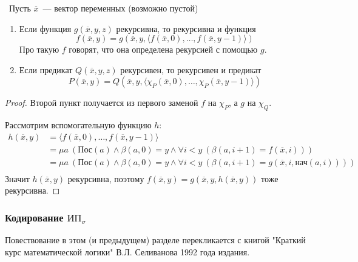\begin{theorem}\
    Пусть $\overline{x}$~— вектор переменных (возможно пустой)
    \begin{enumerate}
        \item Если функция $g(\overline{x}, y, z)$ рекурсивна, то рекурсивна и функция $$f(\overline{x}, y)=g(\overline{x}, y, \langle f(\overline{x}, 0), \ldots, f(\overline{x}, y-1)\rangle)$$ Про такую $f$ говорят, что она определена рекурсией с помощью $g$.
        \item Если предикат $Q(\overline{x}, y, z)$ рекурсивен, то рекурсивен и предикат $$P(\overline{x}, y)=Q(\overline{x}, y, \langle \chi_P(\overline{x}, 0), \ldots, \chi_P(\overline{x}, y-1)\rangle)$$
    \end{enumerate}

\end{theorem}

\begin{proof}
Второй пункт получается из первого заменой $f$ на $\chi_P$, а $g$ на $\chi_Q$.

Рассмотрим вспомогательную функцию $h$:
\[
    \begin{aligned}
        h(\overline{x}, y) &= \langle f(\overline{x}, 0), \ldots, f(\overline{x}, y-1)\rangle \\ 
                           &= \mu a~(\text{Пос}(a)\wedge \beta(a, 0)=y \wedge \forall i<y~(\beta(a, i+1)=f(\overline{x}, i))) \\
                           &= \mu a~(\text{Пос}(a)\wedge \beta(a, 0)=y \wedge \forall i<y~(\beta(a, i+1)=g(\overline{x}, i, \text{нач}(a, i)))) \\
    \end{aligned}
\]
Значит $h(\overline{x}, y)$ рекурсивна, поэтому $f(\overline{x}, y) = g(\overline{x}, y, h(\overline{x}, y))$ тоже рекурсивна.
\end{proof}


\subsubsection{Кодирование $\text{ИП}_\sigma$}
\begin{remark}
    Повествование в этом (и предыдущем) разделе перекликается с книгой "Краткий курс математической логики" В.Л. Селиванова 1992 года издания.
\end{remark}

